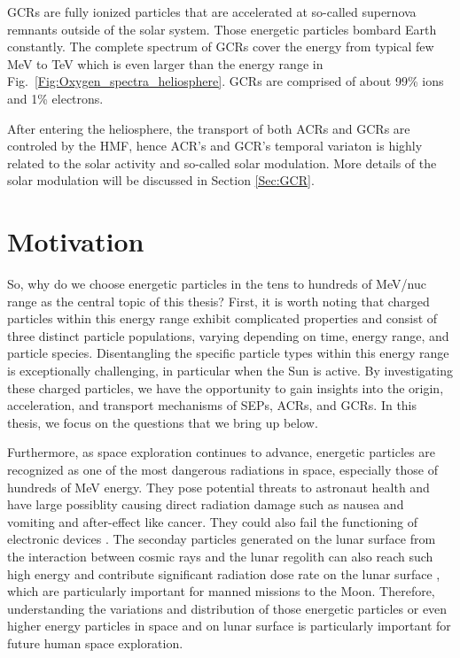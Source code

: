 \acp{GCR} are fully ionized particles that are accelerated at so-called supernova remnants \citep{Blasi2013AARv2013} outside of the solar system. Those energetic particles bombard Earth constantly. The complete spectrum of \acp{GCR} cover the energy from typical few MeV \citep{Potgieter2013LRSP} to TeV which is even larger than the energy range in Fig.~\ref{Fig:Oxygen_spectra_heliosphere}. \acp{GCR} are comprised of about 99\% ions and 1\% electrons.

After entering the heliosphere, the transport of both \acp{ACR} and \acp{GCR} are controled by the \ac{HMF}, hence \ac{ACR}'s and \ac{GCR}'s temporal variaton is highly related to the solar activity and so-called solar modulation. More details of the solar modulation will be discussed in Section \ref{Sec:GCR}.









\section{Motivation}
\label{sec:Motivation}

So, why do we choose energetic particles in the tens to hundreds of MeV/nuc range as the central topic of this thesis? First, it is worth noting that charged particles within this energy range exhibit complicated properties and consist of three distinct particle populations, varying depending on time, energy range, and particle species. Disentangling the specific particle types within this energy range is exceptionally challenging, in particular when the Sun is active.
By investigating these charged particles, we have the opportunity to gain insights into the origin, acceleration, and transport mechanisms of \acp{SEP}, \acp{ACR}, and \acp{GCR}. In this thesis, we focus on the questions that we bring up below.

Furthermore, as space exploration continues to advance, energetic particles are recognized as one of the most dangerous radiations in space, especially those of hundreds of MeV energy. They pose potential threats to astronaut health and have large possiblity causing direct radiation damage such as nausea and vomiting and after-effect like cancer. They could also fail the functioning of electronic devices \citep{Reames2021LNP,  mckenna2015recommendations, armstrong2014strategies}. The seconday particles generated on the lunar surface from the interaction between cosmic rays and the lunar regolith can also reach such high energy and contribute significant radiation dose rate on the lunar surface \citep{Schwadron2016Icarus}, which are particularly important for manned missions to the Moon. Therefore, understanding the variations and distribution of those energetic particles or even higher energy particles in space and on lunar surface is particularly important for future human space exploration.

